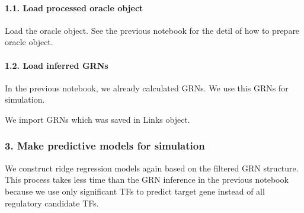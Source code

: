 \documentclass[letterpaper,10pt,english]{sphinxmanual}
\begin{document}
\paragraph{1.1. Load processed oracle object}
\label{\detokenize{notebooks/05_simulation/Gata1_KO_simulation_with_with_Paul_etal_2015_data:1.1.-Load-processed-oracle-object}}
Load the oracle object. See the previous notebook for the detil of how to prepare oracle object.

{
%
\begin{sphinxVerbatim}[commandchars=\\\{\}]
\llap{\color{nbsphinxin}[7]:\,\hspace{\fboxrule}\hspace{\fboxsep}}  
\end{sphinxVerbatim}
}


\paragraph{1.2. Load inferred GRNs}
\label{\detokenize{notebooks/05_simulation/Gata1_KO_simulation_with_with_Paul_etal_2015_data:1.2.-Load-inferred-GRNs}}
In the previous notebook, we already calculated GRNs. We use this GRNs for simulation.

We import GRNs which was saved in Links object.

{
%
\begin{sphinxVerbatim}[commandchars=\\\{\}]
\llap{\color{nbsphinxin}[8]:\,\hspace{\fboxrule}\hspace{\fboxsep}}  
\end{sphinxVerbatim}
}


\subsubsection{3. Make predictive models for simulation}
\label{\detokenize{notebooks/05_simulation/Gata1_KO_simulation_with_with_Paul_etal_2015_data:3.-Make-predictive-models-for-simulation}}
We construct ridge regression models again based on the filtered GRN structure. This process takes less time than the GRN inference in the previous notebook because we use only significant TFs to predict target gene instead of all regulatory candidate TFs.
\end{document}
